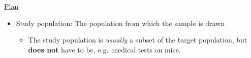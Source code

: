 \underline{Plan}
\begin{itemize}
    \item Study population: The population from which the sample is drawn
          \begin{itemize}
              \item The study population is \emph{usually} a subset of the target population, but
                    \textbf{does not} have to be, e.g.\ medical tests on mice.
          \end{itemize}
\end{itemize}

